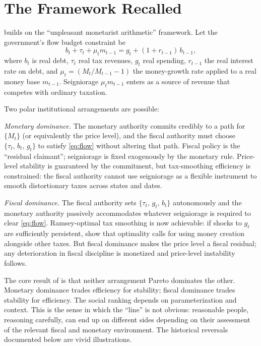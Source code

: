 \documentclass[12pt]{article}
\begin{document}
\section{The Framework Recalled}

\citet{Sargent2011} builds on the \citet{SargentWallace1981}
``unpleasant monetarist arithmetic'' framework.  Let the government's
flow budget constraint be
\begin{equation}
\label{eq:flow}
b_t + \tau_t + \mu_t m_{t-1} = g_t + (1+r_{t-1})\,b_{t-1},
\end{equation}
where $b_t$ is real debt, $\tau_t$ real tax revenues, $g_t$ real spending,
$r_{t-1}$ the real interest rate on debt, and $\mu_t = (M_t/M_{t-1}-1)$
the money-growth rate applied to a real money base $m_{t-1}$.  Seigniorage
$\mu_t m_{t-1}$ enters as a source of revenue that competes with ordinary
taxation.

Two polar institutional arrangements are possible:

\textit{Monetary dominance.}  The monetary authority commits credibly to
a path for $\{M_t\}$ (or equivalently the price level), and the fiscal
authority must choose $\{\tau_t,\, b_t,\, g_t\}$ to satisfy
\eqref{eq:flow} without altering that path.  Fiscal policy is the
``residual claimant''; seigniorage is fixed exogenously by the monetary
rule.  Price-level stability is guaranteed by the commitment, but
tax-smoothing efficiency is constrained: the fiscal authority cannot use
seigniorage as a flexible instrument to smooth distortionary taxes across
states and dates.

\textit{Fiscal dominance.}  The fiscal authority sets
$\{\tau_t,\, g_t,\, b_t\}$ autonomously and the monetary authority
passively accommodates whatever seigniorage is required to clear
\eqref{eq:flow}.  Ramsey-optimal tax smoothing is now achievable:
if shocks to $g_t$ are sufficiently persistent, \citet{LucasStokey1983}
show that optimality calls for using money creation alongside other taxes.
But fiscal dominance makes the price level a fiscal residual; any
deterioration in fiscal discipline is monetized and price-level
instability follows.

The core result of \citet{Sargent2011} is that neither arrangement Pareto
dominates the other.  Monetary dominance trades efficiency for stability;
fiscal dominance trades stability for efficiency.  The social ranking
depends on parameterization and context.  This is the sense in which the
``line'' is not obvious: reasonable people, reasoning carefully, can end
up on different sides depending on their assessment of the relevant
fiscal and monetary environment.  The historical reversals documented
below are vivid illustrations.
\end{document}
